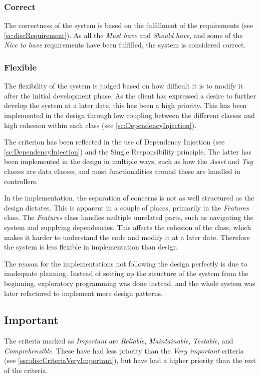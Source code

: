 \subsubsection{Correct}
The correctness of the system is based on the fulfillment of the requirements (see \autoref{sc:discRequirement}). As all the \textit{Must have} and \textit{Should have}, and some of the \textit{Nice to have} requirements have been fulfilled, the system is considered correct.

\subsubsection{Flexible}
The flexibility of the system is judged based on how difficult it is to modify it after the initial development phase. As the client has expressed a desire to further develop the system at a later date, this has been a high priority. This has been implemented in the design through low coupling between the different classes and high cohesion within each class (see \autoref{sc:DependencyInjection}).
\par
The criterion has been reflected in the use of Dependency Injection (see \autoref{sc:DependencyInjection}) and the Single Responsibility principle. The latter has been implemented in the design in multiple ways, such as how the \textit{Asset} and \textit{Tag} classes are data classes, and most functionalities around these are handled in controllers.
\par
In the implementation, the separation of concerns is not as well structured as the design dictates. This is apparent in a couple of places, primarily in the \textit{Features} class. The \textit{Features} class handles multiple unrelated parts, such as navigating the system and supplying dependencies. This affects the cohesion of the class, which makes it harder to understand the code and modify it at a later date. Therefore the system is less flexible in implementation than design.
\par
The reason for the implementations not following the design perfectly is due to inadequate planning. Instead of setting up the structure of the system from the beginning, exploratory programming was done instead, and the whole system was later refactored to implement more design patterns. %

\subsection{Important} \label{ssc:discCriteriaImportant}
The criteria marked as \textit{Important} are \textit{Reliable}, \textit{Maintainable}, \textit{Testable}, and \textit{Comprehensible}. These have had less priority than the \textit{Very important} criteria (see \autoref{ssc:discCriteriaVeryImportant}), but have had a higher priority than the rest of the criteria.


